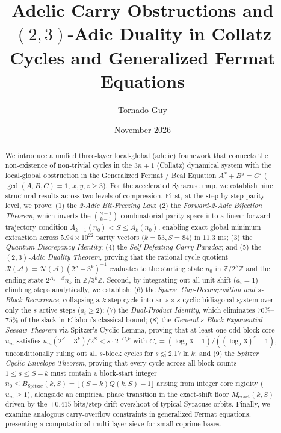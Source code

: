 \documentclass[11pt, a4paper]{amsart}
\title[Adelic Carry Obstructions and $(2,3)$-Adic Duality]{Adelic Carry Obstructions and $(2,3)$-Adic Duality in Collatz Cycles and Generalized Fermat Equations}
\author{Tornado Guy}
\date{November 2026}
\theoremstyle{definition}
\newcommand{\Z}{\mathbb{Z}}
\newcommand{\N}{\mathcal{N}}
\newcommand{\A}{\mathcal{A}}
\newcommand{\Rcal}{\mathcal{R}}
\begin{document}
\begin{abstract}
We introduce a unified three-layer local-global (adelic) framework that connects the non-existence of non-trivial cycles in the $3n+1$ (Collatz) dynamical system with the local-global obstruction in the Generalized Fermat / Beal Equation $A^x + B^y = C^z$ ($\gcd(A,B,C)=1$, $x,y,z \ge 3$). For the accelerated Syracuse map, we establish nine structural results across two levels of compression. First, at the step-by-step parity level, we prove: (1) the \emph{2-Adic Bit-Freezing Law}; (2) the \emph{Forward-2-Adic Bijection Theorem}, which inverts the $\binom{S-1}{k-1}$ combinatorial parity space into a linear forward trajectory condition $A_{k-1}(n_0) < S \le A_k(n_0)$, enabling exact global minimum extraction across $5.94 \times 10^{22}$ parity vectors ($k=53, S=84$) in $11.3\text{ ms}$; (3) the \emph{Quantum Discrepancy Identity}; (4) the \emph{Self-Defeating Carry Paradox}; and (5) the \emph{$(2,3)$-Adic Duality Theorem}, proving that the rational cycle quotient $\Rcal(\A) = \N(\A)(2^S - 3^k)^{-1}$ evaluates to the starting state $n_0$ in $\Z/2^S\Z$ and the ending state $2^{A_k-S} n_k$ in $\Z/3^k\Z$. Second, by integrating out all unit-shift ($a_i = 1$) climbing steps analytically, we establish: (6) the \emph{Sparse Gap-Decomposition and $s$-Block Recurrence}, collapsing a $k$-step cycle into an $s \times s$ cyclic bidiagonal system over only the $s$ active steps ($a_i \ge 2$); (7) the \emph{Dual-Product Identity}, which eliminates $70\%$--$75\%$ of the slack in Eliahou's classical bound; (8) the \emph{General $s$-Block Exponential Seesaw Theorem} via Spitzer's Cyclic Lemma, proving that at least one odd block core $u_m$ satisfies $u_m (2^S - 3^k)/2^S < s \cdot 2^{-C_s k}$ with $C_s = (\log_2 3 - 1)/((\log_2 3)^s - 1)$, unconditionally ruling out all $s$-block cycles for $s \lesssim 2.17 \ln k$; and (9) the \emph{Spitzer Cyclic Envelope Theorem}, proving that every cycle across all block counts $1 \le s \le S - k$ must contain a block-start integer $n_0 \le B_{\text{Spitzer}}(k, S) = \lfloor (S - k) Q(k, S) - 1 \rfloor$ arising from integer core rigidity ($u_m \ge 1$), alongside an empirical phase transition in the exact-shift floor $M_{\text{exact}}(k, S)$ driven by the $+0.415$ bits/step drift overshoot of typical Syracuse orbits. Finally, we examine analogous carry-overflow constraints in generalized Fermat equations, presenting a computational multi-layer sieve for small coprime bases.
\end{abstract}

\maketitle
\end{document}
